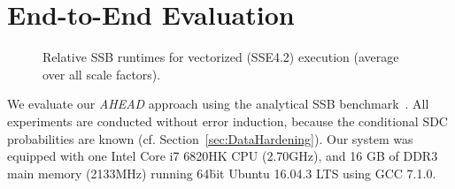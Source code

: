 
\section{End-to-End Evaluation}
\label{sec:SSBEval}

\begin{figure*}[t!]%
	\centering
	\footnotesize
	\graphicspath{{results/ssb/report/}}
	\begin{subfigure}[t]{6.5in}
		
	\end{subfigure}
	\vspace{-0.3cm}
	\caption{Relative SSB runtimes for vectorized (SSE4.2) execution (average over all scale factors).}%
	\label{fig:eval:runtime}%
	\vspace{-0.4cm}
\end{figure*}

We evaluate our \emph{AHEAD} approach using the analytical SSB benchmark~\cite{oneil2009ssbm}. All experiments are conducted without error induction, because the conditional SDC probabilities are known (cf. Section~\ref{sec:DataHardening}). Our system was equipped with one Intel\textsuperscript{\textregistered} Core\textsuperscript{\texttrademark} i7 6820HK CPU (\textat 2.70GHz), and 16 GB of DDR3 main memory (\textat 2133MHz) running 64\=bit Ubuntu 16.04.3 LTS using GCC 7.1.0.





